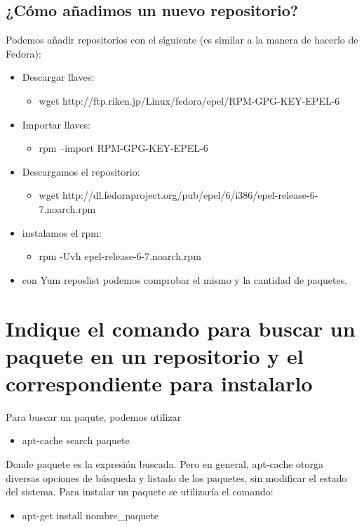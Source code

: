 \cite{E2}

\subsection{ ¿Cómo añadimos un nuevo repositorio?}
Podemos añadir repositorios con el siguiente (es similar a la manera de hacerlo de Fedora):
\begin{itemize}


\item Descargar llaves:
	\begin{itemize}
	\item wget http://ftp.riken.jp/Linux/fedora/epel/RPM-GPG-KEY-EPEL-6
	\end{itemize}
\item Importar llaves:
	\begin{itemize}
	\item rpm --import RPM-GPG-KEY-EPEL-6
	\end{itemize}	 
\item Descargamos el repositorio:
	\begin{itemize}
	\item   wget http://dl.fedoraproject.org/pub/epel/6/i386/epel-release-6-7.noarch.rpm
	\end{itemize}
\item instalamos el rpm:
	\begin{itemize}
	\item rpm -Uvh epel-release-6-7.noarch.rpm
	\end{itemize}
\item con Yum reposlist podemos comprobar el mismo y la cantidad de paquetes.
\end{itemize}

\cite{E3}

\section{Indique el comando para buscar un paquete en un repositorio y el correspondiente para instalarlo}

Para buscar un paqute, podemos utilizar 
\begin{itemize}
\item apt-cache search paquete
\end{itemize}
Donde paquete es la expresión buscada. Pero en general, apt-cache otorga diversas opciones de búsqueda y listado de los paquetes, sin modificar el estado del sistema. Para instalar un paquete se utilizaría el comando:
\begin{itemize}
\item apt-get install nombre\_paquete
\end{itemize}

